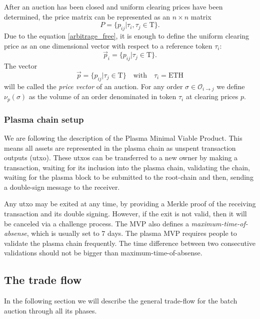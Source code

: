 \documentclass[11pt,parskip=full]{scrartcl}%
\newcommand{\Tau}{\mathrm{T}}
\def\pO{\mathcal{O}}
\def\ra{\rightarrow}
\begin{document}
After an auction has been closed and uniform clearing prices have been determined, the price matrix can be represented as an $n\times n$ matrix 
\[P = \{p_{ij}| \tau_i, \tau_j \in \Tau \}.\]
Due to the equation \ref{arbitrage_free}, it is enough to define the uniform clearing price as an one dimensional vector with respect to a reference token $\tau_i$:
\[ \vec{p}_i = \{p_{ij}| \tau_j \in \Tau \}.\]
The vector
\begin{equation}
\vec{p} =\{ p_{ij}| \tau_j \in \Tau \} \quad \text{with} \quad \tau_i =\text{ETH}
\label{pricevector}
\end{equation}
will be called the \emph{price vector} of an auction.\newline
For any order $\sigma \in \pO_{i\ra j}$ we define $\nu_p(\sigma)$ as the volume of an order denominated in token $\tau_i$ at clearing prices $p$.


\subsubsection{Plasma chain setup}
We are following the description of the Plasma Minimal Viable Product\cite{MVP}. 
This means all assets are represented in the plasma chain as unspent transaction outputs (utxo). 
These utxos can be transferred to a new owner by making a transaction, waiting for its inclusion into the plasma chain, validating the chain, waiting for the plasma block to be submitted to the root-chain and then, sending a double-sign message to the receiver. 

Any utxo may be exited at any time, by providing a Merkle proof of the receiving transaction and its double signing. 
However, if the exit is not valid, then it will be canceled via a challenge process.
The MVP also defines a \emph{maximum-time-of-absense}\label{exit-time}, which is usually set to 7 days. The plasma MVP requires people to validate the plasma chain frequently.
The time difference between two consecutive validations should not be bigger than maximum-time-of-absense.


\subsection{The trade flow}
\label{subsec:data}

In the following section we will describe the general trade-flow for the batch auction through all its phases.
\end{document}
